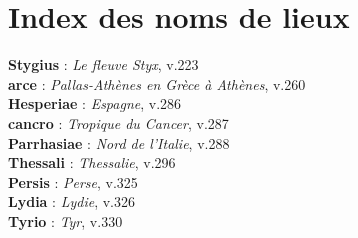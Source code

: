 \documentclass[12pt, a4paper]{report}
\begin{document}
\section*{Index des noms de lieux}
\textbf{Stygius} : \textit{Le fleuve Styx}, v.223 \\ \textbf{ arce} : \textit{Pallas-Athènes en Grèce à Athènes}, v.260 \\ \textbf{Hesperiae} : \textit{Espagne}, v.286 \\ \textbf{cancro} : \textit{Tropique du Cancer}, v.287 \\ \textbf{Parrhasiae} : \textit{Nord de l'Italie}, v.288 \\ \textbf{Thessali} : \textit{Thessalie}, v.296 \\ \textbf{Persis} : \textit{Perse}, v.325 \\ \textbf{Lydia} : \textit{Lydie}, v.326 \\ \textbf{Tyrio} : \textit{Tyr}, v.330 \\ 
\printglossaries
\end{document}
